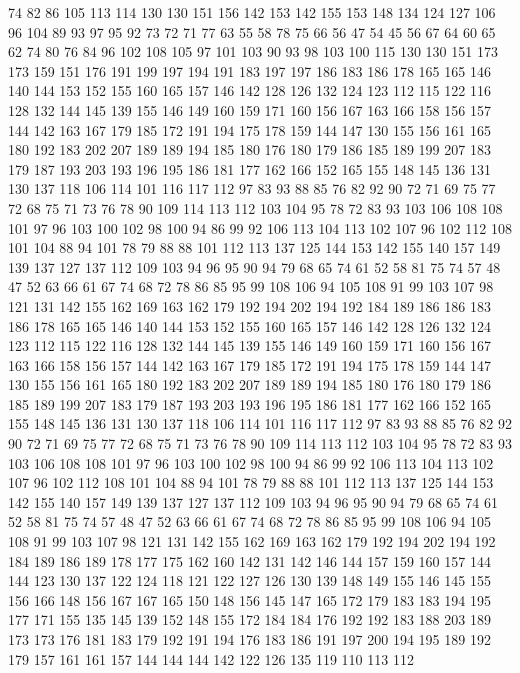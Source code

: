 74 82 86 105 113 114 130 130 151 156 142 153 142 155 153 148 134 124 127 106
96 104 89 93 97 95 92 73 72 71 77 63 55 58 78 75 66 56 47 54
45 56 67 64 60 65 62 74 80 76 84 96 102 108 105 97 101 103 90 93
98 103 100 115 130 130 151 173 173 159 151 176 191 199 197 194 191 183 197 197
186 183 186 178 165 165 146 140 144 153 152 155 160 165 157 146 142 128 126 132
124 123 112 115 122 116 128 132 144 145 139 155 146 149 160 159 171 160 156 167
163 166 158 156 157 144 142 163 167 179 185 172 191 194 175 178 159 144 147 130
155 156 161 165 180 192 183 202 207 189 189 194 185 180 176 180 179 186 185 189
199 207 183 179 187 193 203 193 196 195 186 181 177 162 166 152 165 155 148 145
136 131 130 137 118 106 114 101 116 117 112 97 83 93 88 85 76 82 92 90
72 71 69 75 77 72 68 75 71 73 76 78 90 109 114 113 112 103 104 95
78 72 83 93 103 106 108 108 101 97 96 103 100 102 98 100 94 86 99 92
106 113 104 113 102 107 96 102 112 108 101 104 88 94 101 78 79 88 88 101
112 113 137 125 144 153 142 155 140 157 149 139 137 127 137 112 109 103 94 96
95 90 94 79 68 65 74 61 52 58 81 75 74 57 48 47 52 63 66 61
67 74 68 72 78 86 85 95 99 108 106 94 105 108 91 99 103 107 98 121
131 142 155 162 169 163 162 179 192 194 202 194 192 184 189 186 186 183 186 178
165 165 146 140 144 153 152 155 160 165 157 146 142 128 126 132 124 123 112 115
122 116 128 132 144 145 139 155 146 149 160 159 171 160 156 167 163 166 158 156
157 144 142 163 167 179 185 172 191 194 175 178 159 144 147 130 155 156 161 165
180 192 183 202 207 189 189 194 185 180 176 180 179 186 185 189 199 207 183 179
187 193 203 193 196 195 186 181 177 162 166 152 165 155 148 145 136 131 130 137
118 106 114 101 116 117 112 97 83 93 88 85 76 82 92 90 72 71 69 75
77 72 68 75 71 73 76 78 90 109 114 113 112 103 104 95 78 72 83 93
103 106 108 108 101 97 96 103 100 102 98 100 94 86 99 92 106 113 104 113
102 107 96 102 112 108 101 104 88 94 101 78 79 88 88 101 112 113 137 125
144 153 142 155 140 157 149 139 137 127 137 112 109 103 94 96 95 90 94 79
68 65 74 61 52 58 81 75 74 57 48 47 52 63 66 61 67 74 68 72
78 86 85 95 99 108 106 94 105 108 91 99 103 107 98 121 131 142 155 162
169 163 162 179 192 194 202 194 192 184 189 186 189 178 177 175 162 160 142 131
142 146 144 157 159 160 157 144 144 123 130 137 122 124 118 121 122 127 126 130
139 148 149 155 146 145 155 156 166 148 156 167 167 165 150 148 156 145 147 165
172 179 183 183 194 195 177 171 155 135 145 139 152 148 155 172 184 184 176 192
192 183 188 203 189 173 173 176 181 183 179 192 191 194 176 183 186 191 197 200
194 195 189 192 179 157 161 161 157 144 144 144 142 122 126 135 119 110 113 112
